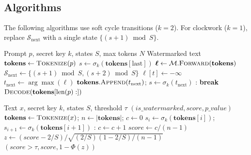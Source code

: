 \documentclass[11pt]{article}
\theoremstyle{definition}
\theoremstyle{remark}
\begin{document}
\subsection{Algorithms}

The following algorithms use soft cycle transitions ($k=2$). For clockwork ($k=1$), replace $\mathcal{S}_{\text{next}}$ with a single state $\{(s+1) \bmod S\}$.

\begin{algorithm}[t]
\caption{MCL Watermark Embedding (Soft Cycle)}
\label{alg:embed}
\begin{algorithmic}[1]
\Require Prompt $p$, secret key $k$, states $S$, max tokens $N$
\Ensure Watermarked text
\State $\mathbf{tokens} \gets \textsc{Tokenize}(p)$
\State $s \gets \sigma_k(\mathbf{tokens}[\text{last}])$ 
    \State $\boldsymbol{\ell} \gets \mathcal{M}.\textsc{Forward}(\mathbf{tokens})$ 
    \State $\mathcal{S}_{\text{next}} \gets \{(s+1) \bmod S, (s+2) \bmod S\}$ 
            \State $\boldsymbol{\ell}[t] \gets -\infty$ 
        \EndIf
    \EndFor
    \State $t_{\text{next}} \gets \arg\max(\boldsymbol{\ell})$ 
    \State $\mathbf{tokens}.\textsc{Append}(t_{\text{next}})$; $s \gets \sigma_k(t_{\text{next}})$
    : \textbf{break} \EndIf
\EndFor
\State \Return $\textsc{Decode}(\mathbf{tokens}[\text{len}(p):])$
\end{algorithmic}
\end{algorithm}

\begin{algorithm}[t]
\caption{MCL Watermark Detection (Soft Cycle)}
\label{alg:detect}
\begin{algorithmic}[1]
\Require Text $x$, secret key $k$, states $S$, threshold $\tau$
\Ensure $(is\_watermarked, score, p\_value)$
\State $\mathbf{tokens} \gets \textsc{Tokenize}(x)$; $n \gets |\mathbf{tokens}|$; $c \gets 0$
    \State $s_i \gets \sigma_k(\mathbf{tokens}[i])$; $s_{i+1} \gets \sigma_k(\mathbf{tokens}[i+1])$
    : $c \gets c + 1$ \EndIf {}
\EndFor
\State $score \gets c/(n-1)$
\State $z \gets (score - 2/S) / \sqrt{(2/S)(1-2/S)/(n-1)}$ 
\State \Return $(score > \tau, score, 1-\Phi(z))$
\end{algorithmic}
\end{algorithm}
\end{document}
